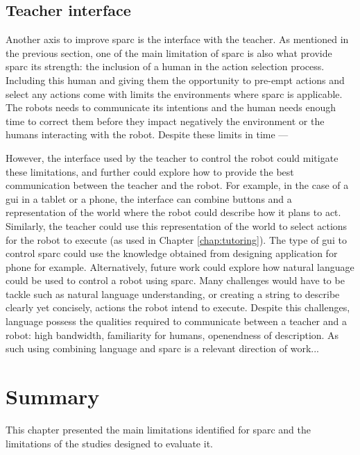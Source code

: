 \subsection{Teacher interface}

Another axis to improve \gls{sparc} is the interface with the teacher. As mentioned in the previous section, one of the main limitation of \gls{sparc} is also what provide \gls{sparc} its strength: the inclusion of a human in the action selection process. Including this human and giving them the opportunity to pre-empt actions and select any actions come with limits the environments where \gls{sparc} is applicable. The robots needs to communicate its intentions and the human needs enough time to correct them before they impact negatively the environment or the humans interacting with the robot. Despite these limits in time ---

However, the interface used by the teacher to control the robot could mitigate these limitations, and further could explore how to provide the best communication between the teacher and the robot. For example, in the case of a \gls{gui} in a tablet or a phone, the interface can combine buttons and a representation of the world where the robot could describe how it plans to act. Similarly, the teacher could use this representation of the world to select actions for the robot to execute (as used in Chapter \ref{chap:tutoring}). The type of \gls{gui} to control \gls{sparc} could use the knowledge obtained from designing application for phone for example. Alternatively, future work could explore how natural language could be used to control a robot using \gls{sparc}. Many challenges would have to be tackle such as natural language understanding, or creating a string to describe clearly yet concisely, actions the robot intend to execute. Despite this challenges, language possess the qualities required to communicate between a teacher and a robot: high bandwidth, familiarity for humans, openendness of description. As such using combining language and \gls{sparc} is a relevant direction of work...

\section{Summary} \label{sec:disc_summary}

This chapter presented the main limitations identified for \gls{sparc} and the limitations of the studies designed to evaluate it.